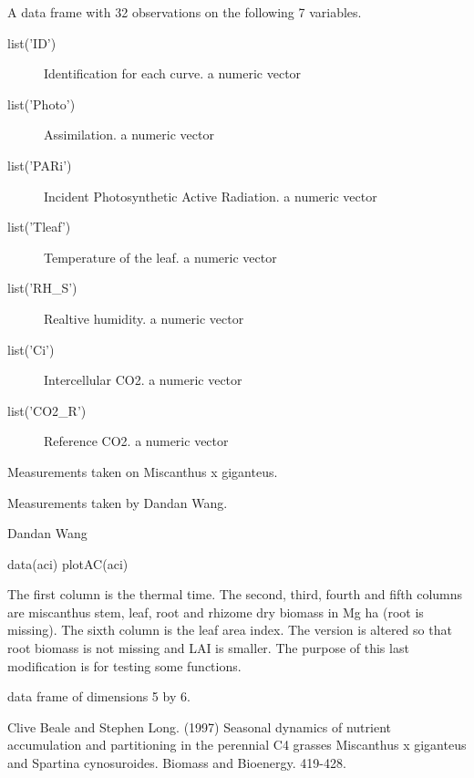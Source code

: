 \documentclass[letterpaper]{book}
\begin{document}
\begin{Format}
A data frame with 32 observations on the following 7 variables.
\begin{description}
 \item[list('ID')] Identification for each curve. a numeric
vector\item[list('Photo')] Assimilation. a numeric vector
\item[list('PARi')] Incident Photosynthetic Active Radiation. a numeric
vector\item[list('Tleaf')] Temperature of the leaf. a numeric vector
\item[list('RH\_S')] Realtive humidity. a numeric vector
\item[list('Ci')] Intercellular CO2. a numeric vector
\item[list('CO2\_R')] Reference CO2. a numeric vector
\end{description}
\end{Format}
%
\begin{Details}\relax
Measurements taken on Miscanthus x giganteus.
\end{Details}
%
\begin{Source}\relax
Measurements taken by Dandan Wang.
\end{Source}
%
\begin{References}\relax
Dandan Wang
\end{References}
%
\begin{Examples}
\begin{ExampleCode}
data(aci)
plotAC(aci)
\end{ExampleCode}
\end{Examples}
%
\begin{Description}\relax
The first column is the thermal time. The second, third,
fourth and fifth columns are miscanthus stem, leaf, root
and rhizome dry biomass in Mg ha (root is
missing). The sixth column is the leaf area index. The
 version is altered so that root biomass
is not missing and LAI is smaller. The purpose of this
last modification is for testing some functions.
\end{Description}
%
\begin{Format}
data frame of dimensions 5 by 6.
\end{Format}
%
\begin{Source}\relax
Clive Beale and Stephen Long. (1997) Seasonal dynamics of
nutrient accumulation and partitioning in the perennial
C4 grasses Miscanthus x giganteus and Spartina
cynosuroides. Biomass and Bioenergy. 419-428.
\end{Source}
\end{document}
